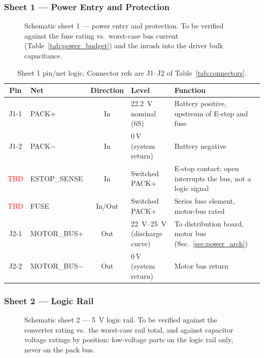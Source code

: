 \subsubsection{Sheet 1 --- Power Entry and Protection}
\begin{figure}[htbp]
\centering
{}
\caption[Schematic sheet 1: power entry and protection]{Schematic sheet 1 --- power entry and protection. To be verified
against the fuse rating vs.\ worst-case bus current
(Table~\ref{tab:power_budget}) and the inrush into the driver bulk
capacitance.}
\label{fig:sch_power_entry}
\end{figure}

\begin{table}[htbp]
\centering
\caption[Sheet 1 pin/net logic]{Sheet 1 pin/net logic. Connector refs are J1--J2 of Table~\ref{tab:connectors}.}
\label{tab:pins_power_entry}
\small
\setlength{\tabcolsep}{4pt}
\begin{tabular}{c L{2.6cm} c L{2.4cm} L{5.4cm}}
\toprule
Pin & Net & Direction & Level & Function \\
\midrule
J1-1 & PACK+ & In & \qty{22.2}{\volt} nominal (6S) & Battery positive, upstream of E-stop and fuse \\
J1-2 & PACK$-$ & In & 0\,V (system return) & Battery negative \\
\textcolor{red}{TBD} & ESTOP\_SENSE & In & Switched PACK+ & E-stop contact; open interrupts the bus, not a logic signal \\
\textcolor{red}{TBD} & FUSE & In/Out & Switched PACK+ & Series fuse element, motor-bus rated \\
J2-1 & MOTOR\_BUS+ & Out & \qtyrange{22}{25}{\volt} (discharge curve) & To distribution board, motor bus (Sec.~\ref{sec:power_arch}) \\
J2-2 & MOTOR\_BUS$-$ & Out & 0\,V (system return) & Motor bus return \\
\bottomrule
\end{tabular}
\end{table}

\subsubsection{Sheet 2 --- Logic Rail}
\begin{figure}[htbp]
\centering
{}
\caption[Schematic sheet 2: logic rail]{Schematic sheet 2 --- \qty{5}{\volt} logic rail. To be verified against
the converter rating vs.\ the worst-case rail total, and against capacitor
voltage ratings by position: low-voltage parts on the logic rail only, never on
the pack bus.}
\label{fig:sch_logic_rail}
\end{figure}

